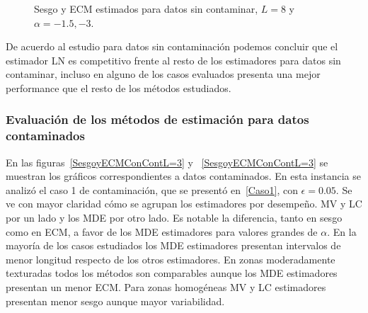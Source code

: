 \begin{figure}[htb]
	\caption{\label{SesgoyECMSinContL=8,-1.5y-3}\small Sesgo y ECM estimados para datos sin contaminar, $ L=8$ y $\alpha=-1.5, -3$.}
\end{figure}

De acuerdo al estudio para datos sin contaminación podemos concluir que el estimador LN es competitivo frente al resto de los estimadores para datos sin contaminar, incluso en alguno de los casos evaluados presenta una mejor performance que el resto de los métodos estudiados.

\subsubsection{Evaluación de los métodos de estimación para datos contaminados}

En las figuras~\ref{SesgoyECMConContL=3} y ~\ref{SesgoyECMConContL=3} se muestran los gráficos correspondientes a datos contaminados. En esta instancia se analizó el caso 1 de contaminación, que se presentó en~\ref{Caso1}, con $\epsilon=0.05$. Se ve con mayor claridad cómo se agrupan los estimadores por desempeño. MV y LC por un lado y los MDE por otro lado. Es notable la diferencia, tanto en sesgo como en ECM, a favor de los MDE estimadores para valores grandes de $\alpha$. En la mayoría de los casos estudiados los MDE estimadores presentan intervalos de menor longitud respecto de los otros estimadores. En zonas moderadamente texturadas todos los métodos son comparables aunque los MDE estimadores presentan un menor ECM. Para zonas homogéneas MV y LC estimadores presentan menor sesgo aunque mayor variabilidad.

